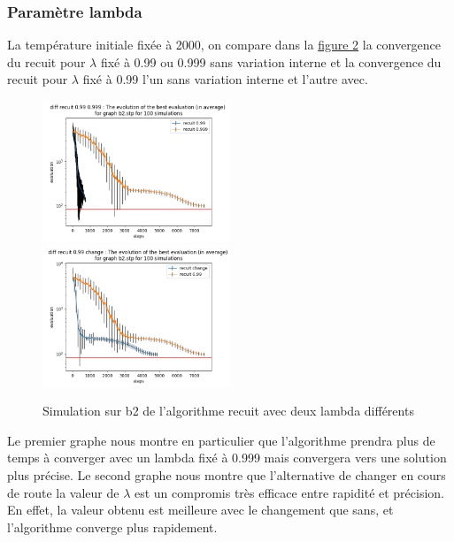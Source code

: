 \documentclass[11pt,french]{report}
\begin{document}
        \subsubsection{Paramètre lambda}
        La température initiale fixée à 2000, on compare dans la \hyperref[Figure2]{figure 2} la convergence du recuit pour $\lambda$ fixé à 0.99 ou 0.999 sans variation interne et la convergence du recuit pour $\lambda$ fixé à 0.99 l'un sans variation interne et l'autre avec.
        \begin{figure}
        		\includegraphics[width=0.5\textwidth]{best_b2_evaluation_diff recuit 0.99 0.999.png}
        		\includegraphics[width=0.5\textwidth]{best_b2_evaluation_diff recuit 0.99 change.png}
        	\caption{Simulation sur b2 de l'algorithme recuit avec deux lambda différents}
        	\label{Figure2}
        \end{figure}
        
        Le premier graphe nous montre en particulier que l'algorithme prendra plus de temps à converger avec un lambda fixé à 0.999 mais convergera vers une solution plus précise. Le second graphe nous montre que l'alternative de changer en cours de route la valeur de $\lambda$ est un compromis très efficace entre rapidité et précision. En effet, la valeur obtenu est meilleure avec le changement que sans, et l'algorithme converge plus rapidement. 
\end{document}
